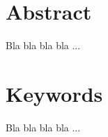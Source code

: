 \chapter*{Abstract}

Bla bla bla bla ...

\begingroup %
\renewcommand{\cleardoublepage}{}
\renewcommand{\clearpage}{}
\chapter*{Keywords}
\endgroup

Bla bla bla bla ...
